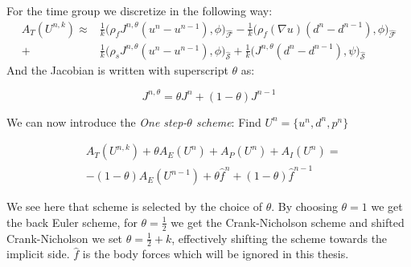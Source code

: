 For the time group we discretize in the following way:
\begin{align}
A_T(U^{n,k}) \approx & \frac{1}{k} \big( \rho_f J^{n,\theta} (u^n - u^{n-1}) , \phi  \big)_{\mathcal{\hat{F}}} - \frac{1}{k} \big( \rho_f (\nabla u ) (d^n - d^{n-1}) , \phi \big)_{\mathcal{\hat{F}}} \\
+ & \frac{1}{k} \big( \rho_s J^{n,\theta} (u^n - u^{n-1}) , \phi  \big)_{\mathcal{\hat{S}}} +  \frac{1}{k} \big(  J^{n,\theta} (d^n - d^{n-1}) , \psi  \big)_{\mathcal{\hat{S}}}
\end{align}
And the Jacobian is written with superscript $\theta$ as:

\begin{equation}
J^{n, \theta} = \theta J^n + (1-\theta)J^{n-1}
\end{equation}

We can now introduce the \textit{One step-$\theta$ scheme}: 
Find $U^n = \{u^n , d^n, p^n \}$

\begin{align}
& A_T(U^{n,k}) + \theta A_E(U^{n}) + A_P(U^{n}) + A_I(U^{n}) = \\
& - (1-\theta) A_E(U^{n-1}) + \theta \hat{f}^n + (1-\theta) \hat{f}^{n-1}  
\end{align}

We see here that scheme is selected by the choice of $\theta $. By choosing $ \theta = 1$ we get the back Euler scheme, for $ \theta = \frac{1}{2}$ we get the Crank-Nicholson scheme and shifted Crank-Nicholson we set $ \theta = \frac{1}{2} + k$, effectively shifting the scheme towards the implicit side. $\hat{f}$ is the body forces which will be ignored in this thesis. 






